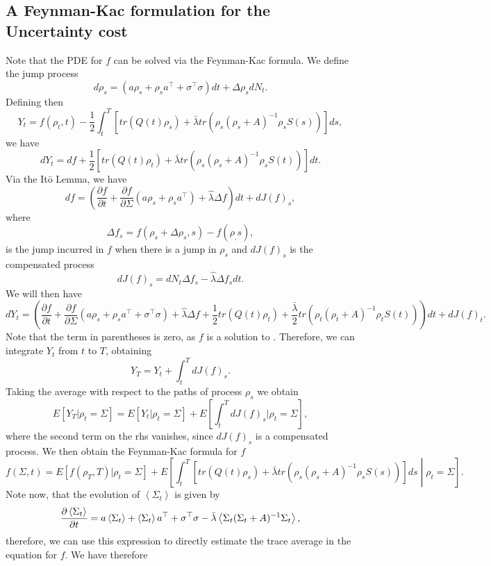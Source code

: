 \subsection{A Feynman-Kac formulation for the Uncertainty cost}

Note that the PDE for $f$ can be solved via the Feynman-Kac formula. We define the jump process
\[
d\rho_s = (a\rho_s + \rho_s a^\top  + \sigma^\top \sigma) dt + \Delta \rho_s dN_t.
\]
Defining then
\[
Y_t = f(\rho_t,t) - \frac{1}{2} \int_t^T \left[tr\left(Q(t)\rho_s\right)+ \bar{\lambda} tr \left(\rho_s(\rho_s+A)^{-1}\rho_s S(s)\right)\right]ds,
\]
we have
\[
dY_t = df + \frac{1}{2}\left[tr\left(Q(t)\rho_t\right)+ \bar{\lambda} tr \left(\rho_s(\rho_s+A)^{-1}\rho_s S(t)\right)\right]dt.
\]
Via the It\=o Lemma, we have
\[
df =\left(\frac{\partial f}{\partial t} + \frac{\partial f}{\partial \Sigma} (a \rho_s + \rho_s a^\top) + \hat{\lambda} \Delta f \right) dt+ d J(f)_s,
\]
where 
\[
\Delta f_s = f(\rho_s + \Delta \rho_s,s) - f(\rho_,s),
\]
is the jump incurred in $f$ when there is a jump in $\rho_s$ and $dJ(f)_s$ is the compensated process
\[
dJ(f)_s = dN_t \Delta f_s - \hat{\lambda} \Delta f_s dt.
\]
We will then have
\[
dY_t = \left(\frac{\partial f}{\partial t} + \frac{\partial f}{\partial \Sigma} (a \rho_s + \rho_s a^\top+\sigma^\top \sigma) + \hat{\lambda} \Delta f + \frac{1}{2}tr\left(Q(t)\rho_t\right)+ \frac{\bar{\lambda}}{2} tr \left(\rho_t(\rho_t+A)^{-1}\rho_t S(t)\right)\right)dt + dJ(f)_t.
\]
Note that the term in parentheses is zero, as $f$ is a solution to . Therefore, we can integrate $Y_t$ from $t$ to $T$, obtaining
\[
Y_T = Y_t + \int_t^T dJ(f)_s.
\]
Taking the average with respect to the paths of process $\rho_s$ we obtain
\[
E\left[Y_T|\rho_t=\Sigma\right]=E\left[Y_t|\rho_t=\Sigma\right] + E\left[\int_t^T dJ(f)_s|\rho_t=\Sigma\right],
\]
where the second term on the rhs vanishes, since $dJ(f)_s$ is a compensated process. We then obtain the Feynman-Kac formula for $f$
\begin{equation}
f(\Sigma,t) =E[f(\rho_T,T)|\rho_t=\Sigma] + E\left[\int_t^T\left[tr\left(Q(t)\rho_s\right)+ \bar{\lambda} tr \left(\rho_s(\rho_s+A)^{-1}\rho_s S(s) \right)\right]ds \middle| \rho_t=\Sigma\right].
\end{equation}
Note now, that the evolution of $\left<\Sigma_t\right>$ is given by
\[
\frac{\partial \left<\Sigma_t\right>}{\partial t} = a \left<\Sigma_t\right> + \left<\Sigma_t\right> a^\top + \sigma^\top\sigma- \bar{\lambda}\left< \Sigma_t(\Sigma_t + A)^{-1} \Sigma_t\right>,
\]
therefore, we can use this expression to directly estimate the trace average in the equation for $f$. We have therefore
